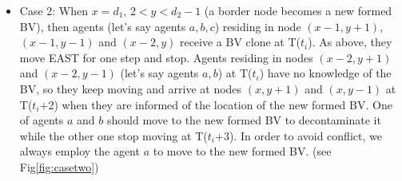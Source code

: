 \begin{itemize}
\item Case 2: When $x=d_1$, $2<y<d_2-1$ (a border node becomes a new formed BV), then agents (let's say agents $a,b,c$) residing in node $(x-1, y+1)$, $(x-1, y-1)$ and $(x-2, y)$ receive a BV clone at T($t_i$). As above, they move EAST for one step and stop. Agents residing in nodes $(x-2, y+1)$ and $(x-2, y-1)$ (let's say agents $a,b$) at T($t_i$) have no knowledge of the BV, so they keep moving and arrive at nodes $(x, y+1)$ and $(x, y-1)$ at T($t_i$+2) when they are informed of the location of the new formed BV. One of agents $a$ and $b$ should move to the new formed BV to decontaminate it while the other one stop moving at T($t_i$+3). In order to avoid conflict, we always employ the agent $a$ to move to the new formed BV. (see Fig\ref{fig:casetwo})
\begin{figure} [H]
  \centering 
    \hspace{1in} 

\end{figure}
\end{itemize}
